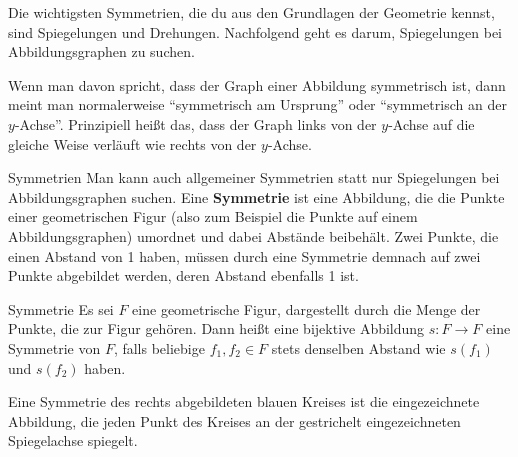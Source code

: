 \documentclass[../../main.tex]{subfiles}
\begin{document}
\label{sec:abbildungen_symmetrie}

Die wichtigsten Symmetrien, die du aus den Grundlagen der Geometrie kennst, sind Spiegelungen und Drehungen. Nachfolgend geht es darum, Spiegelungen bei Abbildungsgraphen zu suchen.

Wenn man davon spricht, dass der Graph einer Abbildung symmetrisch ist, dann meint man normalerweise \enquote{symmetrisch am Ursprung} oder \enquote{symmetrisch an der $y$-Achse}. Prinzipiell heißt das, dass der Graph links von der $y$-Achse auf die gleiche Weise verläuft wie rechts von der $y$-Achse.

\begin{advanced}{Symmetrien}
    Man kann auch allgemeiner Symmetrien statt nur Spiegelungen bei Abbildungsgraphen suchen. Eine \textbf{Symmetrie} ist eine Abbildung, die die Punkte einer geometrischen Figur (also zum Beispiel die Punkte auf einem Abbildungsgraphen) umordnet und dabei Abstände beibehält. Zwei Punkte, die einen Abstand von 1 haben, müssen durch eine Symmetrie demnach auf zwei Punkte abgebildet werden, deren Abstand ebenfalls 1 ist.
    
    \begin{definition}{Symmetrie}
        Es sei $F$ eine geometrische Figur, dargestellt durch die Menge der Punkte, die zur Figur gehören. Dann heißt eine bijektive Abbildung $s\colon F\rightarrow F$ eine Symmetrie von $F$, falls beliebige $f_1,f_2\in F$ stets denselben Abstand wie $s(f_1)$ und $s(f_2)$ haben.
    \end{definition}
    
    \begin{advexample}{}
        Eine Symmetrie des rechts abgebildeten blauen Kreises ist die eingezeichnete Abbildung, die jeden Punkt des Kreises an der gestrichelt eingezeichneten Spiegelachse spiegelt.
        

\end{advexample}
\end{advanced}
\end{document}
